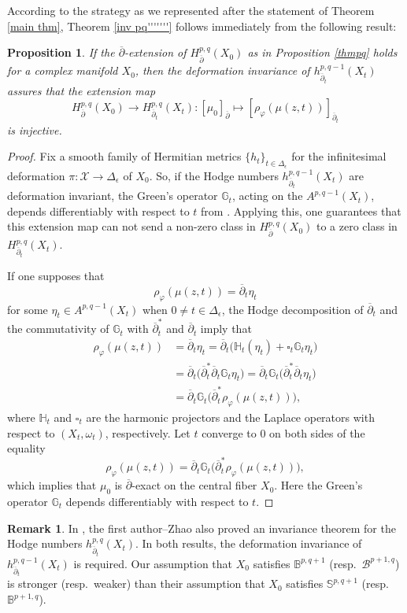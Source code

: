 \documentclass[12pt]{amsart}
\numberwithin{equation}{section}
\newtheorem{proposition}[theorem]{Proposition}
\theoremstyle{definition}
\theoremstyle{definition}
\theoremstyle{definition}
\newtheorem{remark}  [theorem]     {Remark}
\renewcommand{\1}{\mathsf{1}}
\newcommand{\G}{\mathbb{G}}
\newcommand{\db}{\overline{\partial}}
\newcommand{\dbs}{\overline{\partial}^*}
\renewcommand{\>}{\rightarrow}
\newcommand{\bp}{\overline\partial}
\def\v{\varphi}
\theoremstyle{plain} %
\theoremstyle{plain} %
\theoremstyle{plain} %
\begin{document}
	According to the strategy as we represented after  the statement of  Theorem \ref{main thm}, Theorem \ref{inv pq'''''''} follows immediately from the following result:
	\begin{proposition}\label{pq-pq-1}
		If the $\db$-extension of $H^{p,q}_{\db}(X_0)$
		as in Proposition \ref{thmpq} holds for a complex manifold $X_0$,
		then the deformation invariance of $h^{p,q-1}_{\db_t}(X_t)$
		assures that the extension map
		$$H^{p,q}_{\db}(X_0) \longrightarrow H^{p,q}_{\db_t}(X_t):[\mu_0]_{\db} \longmapsto [\rho_\v(\mu(z,t))]_{\db_t}$$
		is injective.
	\end{proposition}
	\begin{proof}
		Fix a smooth family of Hermitian metrics
		$\{h_t\}_{t \in \Delta_{\epsilon}}$ for the infinitesimal
		deformation $\pi: \mathcal{X} \rightarrow \Delta_{\epsilon}$ of
		$X_0$. So, if the Hodge numbers $h^{p,q-1}_{\db_t}(X_t)$ are deformation
		invariant, the Green's operator $\G_t$, acting on the
		$A^{p,q-1}(X_t)$, depends differentiably with respect to $t$ from
		\cite[Theorem 7]{KS60}. Applying this, one guarantees
		that this extension map can not send a non-zero class in
		$H^{p,q}_{\db}(X_0)$ to a zero class in $H^{p,q}_{\db_t}(X_t)$.
		
		If one supposes that
		$$\rho_\v(\mu(z,t))=\db_t \eta_t$$
		for some $\eta_t\in A^{p,q-1}(X_t)$ when $0\neq t \in {\Delta_{\epsilon}}$, the Hodge decomposition of $\db_t$ and the
		commutativity of $\G_t$ with $\dbs_t$ and $\db_t$ imply that
		\begin{align*}
			\rho_\v(\mu(z,t))
			&=\db_t \eta_t= \db_t\big(\mathbb{H}_t(\eta_t) + \square_t \mathbb{G}_t \eta_t\big)\\
			&=\db_t\big(\dbs_t\db_t\G_t \eta_t\big)=\db_t\G_t\big(\dbs_t\db_t \eta_t\big)\\
			&=\db_t\G_t\big(\dbs_t\rho_\v(\mu(z,t))\big),
		\end{align*}
		where $\mathbb{H}_t$ and $\square_t$ are the harmonic projectors and
		the Laplace operators with respect to $(X_t,\omega_t)$, respectively.
		Let $t$ converge to $0$ on both sides of the equality
		\[ \rho_\v(\mu(z,t))
		=
		\db_t\G_t\big(\dbs_t\rho_\v(\mu(z,t))\big),\]
		which implies that $\mu_0$ is $\db$-exact on the central fiber
		$X_0$. Here the Green's operator $\mathbb{G}_t$ depends
		differentiably with respect to $t$.
	\end{proof}
	\begin{remark}\label{Remark 1}
	In \cite[Theorem~1.3]{RZ18}, the first author--Zhao also proved an invariance theorem for the Hodge numbers $h^{p,q}_{\bp_t}(X_t)$. In both results, the deformation invariance of $h^{p,q-1}_{\db_t}(X_t)$ is required. Our assumption that $X_0$ satisfies $\mathbb{B}^{p,q+1}$ (resp.\ $\mathcal{B}^{p+1,q}$) is stronger (resp.\ weaker) than their assumption that $X_0$ satisfies $\mathbb{S}^{p,q+1}$ (resp.\ $\mathbb{B}^{p+1,q}$).
	\end{remark}
	
\end{document}
